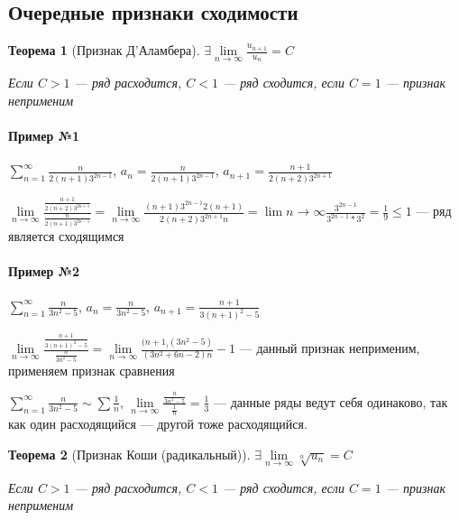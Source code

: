 \documentclass{article}
\newtheorem{theorem}{Теорема}
\begin{document}
\subsection{Очередные признаки сходимости}

\begin{theorem}[Признак Д'Аламбера]

$\exists \lim\limits_{n \to \infty} \frac{u_{n + 1}}{u_{n}} = C$

Если $C > 1$ — ряд расходится, $C < 1$ — ряд сходится, если $C = 1$ — признак неприменим

\end{theorem}

\paragraph{Пример №1}

$\sum\limits_{n = 1}^{\infty} \frac{n}{2(n + 1) 3^{2 n - 1}}$, $a_{n} = \frac{n}{2(n + 1) 3^{2 n - 1}}$, $a_{n + 1} = \frac{n + 1}{2(n + 2) 3^{2 n + 1}}$

$\lim\limits_{n \to \infty} \frac{\frac{n + 1}{2(n + 2) 3^{2 n + 1}}}{\frac{n}{2(n + 1) 3^{2 n - 1}}} = \lim\limits_{n \to \infty} \frac{(n + 1) 3^{2 n - 1} 2 (n + 1)}{2 (n + 2) 3^{2 n + 1} n} = \lim\limits{n \to \infty} \frac{3^{2 n - 1}}{3^{2 n - 1} * 3^2} = \frac{1}{9} \le 1$ — ряд является сходящимся

\paragraph{Пример №2}

$\sum\limits_{n = 1}^{\infty} \frac{n}{3n^2 - 5}$, $a_{n} = \frac{n}{3n^2 - 5}$, $a_{n + 1} = \frac{n + 1}{3 (n + 1)^2 - 5}$

$\lim\limits_{n \to \infty} \frac{\frac{n + 1}{3 (n + 1)^2 - 5}}{\frac{n}{3n^2 - 5}} = \lim\limits_{n \to \infty} \frac{(n + 1_) (3n^2 - 5)}{(3n^2 + 6n - 2) n} - 1$ — данный признак неприменим, применяем признак сравнения

$\sum\limits_{n = 1}^{\infty} \frac{n}{3n^2 - 5} \sim \sum \frac{1}{n}$, $\lim\limits_{n \to \infty} \frac{\frac{n}{3n^2 - 5}}{\frac{1}{n}} = \frac{1}{3}$ — данные ряды ведут себя одинаково, так как один расходящийся — другой тоже расходящийся.


\begin{theorem}[Признак Коши (радикальный)]

$\exists \lim\limits_{n \to \infty} \sqrt[n]{u_{n}} = C$

Если $C > 1$ — ряд расходится, $C < 1$ — ряд сходится, если $C = 1$ — признак неприменим

\end{theorem}
\end{document}
